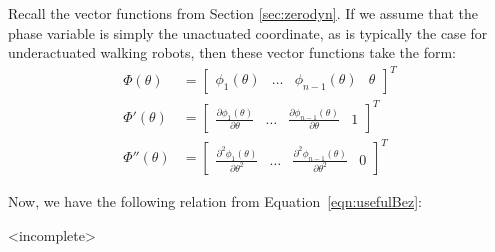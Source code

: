 Recall the vector functions from Section \ref{sec:zerodyn}. If we assume that the phase variable is simply the unactuated coordinate, as is typically the case for underactuated walking robots, then these vector functions take the form:
\begin{align*}
	\Phi\left(\theta\right) &= 
	\begin{bmatrix}
	\phi_1\left(\theta\right) & \ldots & \phi_{n-1}\left(\theta\right) & \theta
	\end{bmatrix}^T \\
	\Phi'\left(\theta\right) &=
	\begin{bmatrix}
	\frac{\partial\phi_1\left(\theta\right)}{\partial\theta} & \ldots & \frac{\partial\phi_{n-1}\left(\theta\right)}{\partial\theta} & 1 
	\end{bmatrix}^T \\
	\Phi''\left(\theta\right) &=
	\begin{bmatrix}
	\frac{\partial^2\phi_1\left(\theta\right)}{\partial\theta^2} & \ldots & \frac{\partial^2\phi_{n-1}\left(\theta\right)}{\partial\theta^2} & 0 
	\end{bmatrix}^T
\end{align*}

Now, we have the following relation from Equation~\ref{eqn:usefulBez}:

{\color{red}<incomplete>}
